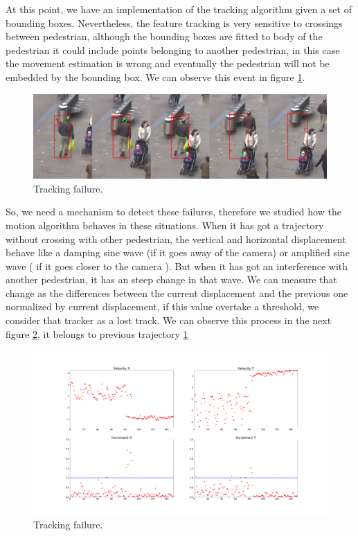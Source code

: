 


At this point, we have an implementation of the tracking algorithm given a set of bounding boxes. Nevertheless, the feature tracking is very sensitive to crossings between pedestrian, although the bounding boxes are fitted to body of the pedestrian it could include points belonging to another pedestrian, in this case the movement estimation is wrong and eventually the pedestrian will not be embedded by the bounding box. We can observe this event in figure \ref{traccs}.


\begin{figure}[H]
\centering         
\includegraphics[width=0.9\linewidth]{velocidadas/mateuPont.png}
\caption{Tracking failure.} \label{traccs}
\end{figure}


So, we need a mechanism to detect these failures, therefore we studied how the motion algorithm behaves in these situations. When it has got a trajectory without crossing with other pedestrian, the vertical and horizontal displacement behave like a damping sine wave (if it goes away of the camera)  or amplified sine wave ( if it goes closer to the camera ). But when it has got an interference with another pedestrian, it has an steep change in that wave. We can measure that change as the differences between the current displacement and the previous one normalized by current displacement, if this value overtake a threshold, we consider that tracker as a lost track. We can observe this process in the next figure \ref{traccs23}, it belongs to previous trajectory \ref{traccs} 


\begin{figure}[H]
\centering         
\includegraphics[width=0.9\linewidth]{velocidadas/bad_threshold.png}
\caption{Tracking failure.} \label{traccs23}
\end{figure}


